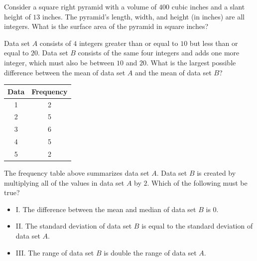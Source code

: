 \vspace{2em}
\newpage

\noindent\markforreview
\vspace{1em}

Consider a square right pyramid with a volume of \(400\) cubic inches and a slant height of \(13\) inches. The pyramid's length, width, and height (in inches) are all integers. What is the surface area of the pyramid in square inches?

\vspace{2em}
\newpage

\noindent\markforreview
\vspace{1em}

Data set \(A\) consists of \(4\) integers greater than or equal to \(10\) but less than or equal to \(20\). Data set \(B\) consists of the same four integers and adds one more integer, which must also be between \(10\) and \(20\). What is the largest possible difference between the mean of data set \(A\) and the mean of data set \(B\)?

\vspace{2em}
\newpage

\noindent\markforreview
\vspace{1em}

\begin{center}
\begin{tabular}{|c|c|}
\hline
Data & Frequency \\
\hline
1 & 2 \\
2 & 5 \\
3 & 6 \\
4 & 5 \\
5 & 2 \\
\hline
\end{tabular}
\end{center}

The frequency table above summarizes data set \(A\). Data set \(B\) is created by multiplying all of the values in data set \(A\) by \(2\). Which of the following must be true?

\begin{itemize}
\item I. The difference between the mean and median of data set \(B\) is \(0\).
\item II. The standard deviation of data set \(B\) is equal to the standard deviation of data set \(A\).
\item III. The range of data set \(B\) is double the range of data set \(A\).
\end{itemize}

